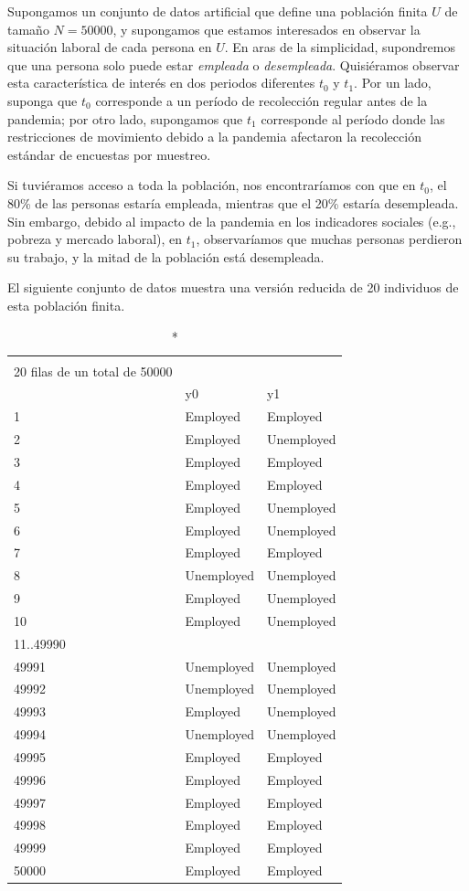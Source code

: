 \documentclass[
  12pt,
  spanish,
]{book}
\begin{document}
Supongamos un conjunto de datos artificial que define una población finita \(U\) de tamaño \(N = 50000\), y supongamos que estamos interesados en observar la situación laboral de cada persona en \(U\). En aras de la simplicidad, supondremos que una persona solo puede estar \emph{empleada} o \emph{desempleada}. Quisiéramos observar esta característica de interés en dos periodos diferentes \(t_0\) y \(t_1\). Por un lado, suponga que \(t_0\) corresponde a un período de recolección regular antes de la pandemia; por otro lado, supongamos que \(t_1\) corresponde al período donde las restricciones de movimiento debido a la pandemia afectaron la recolección estándar de encuestas por muestreo.

Si tuviéramos acceso a toda la población, nos encontraríamos con que en \(t_0\), el 80\% de las personas estaría empleada, mientras que el 20\% estaría desempleada. Sin embargo, debido al impacto de la pandemia en los indicadores sociales (e.g., pobreza y mercado laboral), en \(t_1\), observaríamos que muchas personas perdieron su trabajo, y la mitad de la población está desempleada.

El siguiente conjunto de datos muestra una versión reducida de 20 individuos de esta población finita.

\captionsetup[table]{labelformat=empty,skip=1pt}
\begin{longtable}{lll}
\caption*{
{\large Un vistazo a la población} \\ 
{\small 20 filas de un total de 50000}
} \\ 
\toprule
 & y0 & y1 \\ 
\midrule
1 & Employed & Employed \\ 
2 & Employed & Unemployed \\ 
3 & Employed & Employed \\ 
4 & Employed & Employed \\ 
5 & Employed & Unemployed \\ 
6 & Employed & Unemployed \\ 
7 & Employed & Employed \\ 
8 & Unemployed & Unemployed \\ 
9 & Employed & Unemployed \\ 
10 & Employed & Unemployed \\ 
11..49990 &  &  \\ 
49991 & Unemployed & Unemployed \\ 
49992 & Unemployed & Unemployed \\ 
49993 & Employed & Unemployed \\ 
49994 & Unemployed & Unemployed \\ 
49995 & Employed & Employed \\ 
49996 & Employed & Employed \\ 
49997 & Employed & Employed \\ 
49998 & Employed & Employed \\ 
49999 & Employed & Employed \\ 
50000 & Employed & Employed \\ 
 \bottomrule
\end{longtable}
\end{document}
